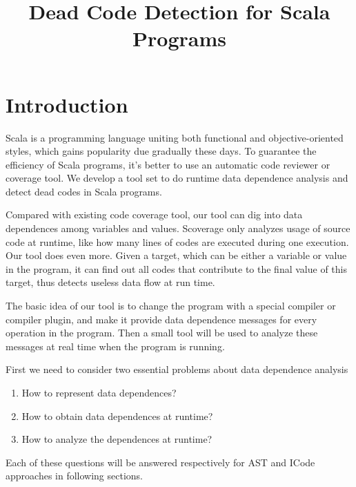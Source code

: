 \documentclass{article}[12pt]
\begin{document}
\title{Dead Code Detection for Scala Programs}
\date{}
\maketitle
\tableofcontents
\newpage
\section{Introduction}
Scala is a programming language uniting both functional and objective-oriented styles, which gains popularity due gradually these days. To guarantee the efficiency of Scala programs, it's better to use an automatic code reviewer or coverage tool. We develop a tool set to do runtime data dependence analysis and detect dead codes in Scala programs. 

Compared with existing code coverage tool, our tool can dig into data dependences among variables and values. Scoverage only analyzes usage of source code at runtime, like how many lines of codes are executed during one execution. Our tool does even more. Given a target, which can be either a variable or value in the program, it can find out all codes that contribute to the final value of this target, thus detects useless data flow at run time. 

The basic idea of our tool is to change the program with a special compiler or compiler plugin, and make it provide data dependence messages for every operation in the program. Then a small tool will be used to analyze these messages at real time when the program is running. 

First we need to consider two essential problems about data dependence analysis 
\begin{enumerate}
\item How to represent data dependences?
\item How to obtain data dependences at runtime?
\item How to analyze the dependences at runtime? 
\end{enumerate}
Each of these questions will be answered respectively for AST and ICode approaches in following sections. 
\end{document}
